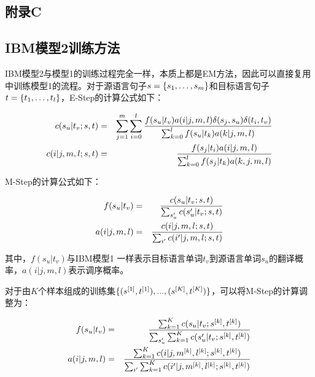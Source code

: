 \begin{appendices}
\chapter{附录C}
\label{appendix-C}


\section{IBM模型2训练方法}

\parinterval IBM模型2与模型1的训练过程完全一样，本质上都是EM方法，因此可以直接复用{\chapterfive}中训练模型1的流程。对于源语言句子${s}=\{s_1,\dots,s_m\}$和目标语言句子${t}=\{t_1,\dots,t_l\}$，E-Step的计算公式如下：

\begin{eqnarray}
c(s_u|t_v;{s},{t}) &=&\sum\limits_{j=1}^{m} \sum\limits_{i=0}^{l} \frac{f(s_u|t_v)a(i|j,m,l) \delta(s_j,s_u)\delta (t_i,t_v) }   {\sum_{k=0}^{l} f(s_u|t_k)a(k|j,m,l)} \\
c(i|j,m,l;{s},{t}) &=&\frac{f(s_j|t_i)a(i|j,m,l)}   {\sum_{k=0}^{l} f(s_j|t_k)a(k,j,m,l)}
\label{eq:append-1}
\end{eqnarray}

\noindent M-Step的计算公式如下：

\begin{eqnarray}
f(s_u|t_v) &=&\frac{c(s_u|t_v;{s},{t}) }    {\sum_{s'_u} c(s'_u|t_v;{s},{t})} \\
a(i|j,m,l) &=&\frac{c(i|j,m,l;{s},{t})}  {\sum_{i'}c(i'|j,m,l;{s},{t})}
\label{eq:append-2}
\end{eqnarray}

\noindent 其中，$f(s_u|t_v)$与IBM模型1 一样表示目标语言单词$t_v$到源语言单词$s_u$的翻译概率，$a(i|j,m,l)$表示调序概率。

\parinterval 对于由$K$个样本组成的训练集$\{({s}^{[1]},{t}^{[1]}),...,({s}^{[K]},{t}^{[K]})\}$，可以将M-Step的计算调整为：

\begin{eqnarray}
f(s_u|t_v) &=&\frac{\sum_{k=1}^{K}c(s_u|t_v;{s}^{[k]},{t}^{[k]}) }    {\sum_{s'_u} \sum_{k=1}^{K} c(s'_u|t_v;{s}^{[k]},{t}^{[k]})} \\
a(i|j,m,l) &=&\frac{\sum_{k=1}^{K}c(i|j,m^{[k]},l^{[k]};{s}^{[k]},{t}^{[k]})}  {\sum_{i'}\sum_{k=1}^{K}c(i'|j,m^{[k]},l^{[k]};{s}^{[k]},{t}^{[k]})}
\label{eq:append-3}
\end{eqnarray}


\end{appendices}
